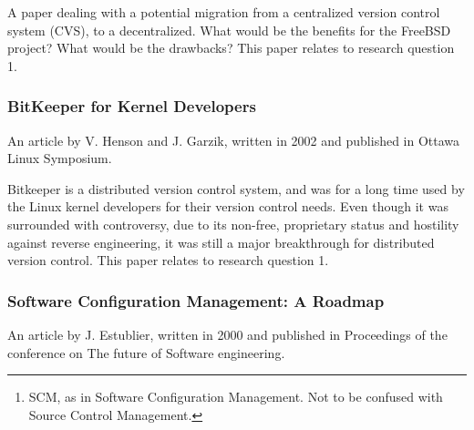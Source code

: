 \documentclass{article}
\begin{document}
A paper dealing with a potential migration from a centralized version
control system (CVS), to a decentralized. What would be the benefits
for the FreeBSD project? What would be the drawbacks? This paper
relates to research question 1.

\subsubsection{BitKeeper for Kernel Developers}

An article by V. Henson and J. Garzik, written in 2002 and published in
Ottawa Linux Symposium\cite{henson02}.

\begin{abstract}
 BitKeeper is a revolutionary new distributed source control management
 suite which is ideal for Linux kernel development. BitKeeper provides tools
 which automate and simplify many common kernel development tasks. In this
 paper, we describe basic BitKeeper concepts and operations, BitKeeper
 solutions for common kernel development problems, and a workflow for
 interacting with other Linux developers using BitKeeper. We also discuss
 some of BitKeeper's shortcomings and what is being done to correct them. We
 conclude that BitKeeper can dramatically imrpove the efficiency of Linux
 kernel developers.
\end{abstract}

Bitkeeper is a distributed version control system, and was for a long
time used by the Linux kernel developers for their version control
needs. Even though it was surrounded with controversy, due to its
non-free, proprietary status and hostility against reverse
engineering, it was still a major breakthrough for distributed version
control. This paper relates to research question 1.

\subsubsection{Software Configuration Management: A Roadmap}

An article by J. Estublier, written in 2000 and published in Proceedings of
the conference on The future of Software engineering\cite{estublier00}.

\begin{abstract}
 This paper, in the first chapter summarizes the state of the art in
 SCM\footnote{
  SCM, as in Software Configuration Management. Not to be confused with
  Source Control Management.
 }, showing the evolution along the last 25 years. Chapter 2 shows the
 current research work under way in the area. In chapter 3, the challenges
 SCM has to take up, as well as SCM future research are discussed.
\end{abstract}
\end{document}
